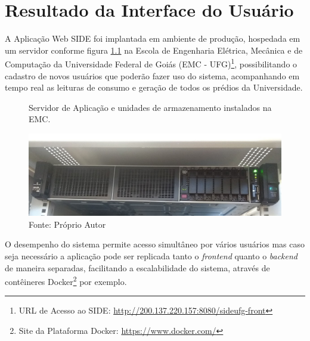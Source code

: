 \chapter {Resultado da Interface do Usuário}
\label{c:resultado_da_interface_do_usuario}

A Aplicação Web SIDE foi implantada em ambiente de produção, hospedada em um servidor conforme figura \ref{fig:servidor} na Escola de Engenharia Elétrica, Mecânica e de Computação da Universidade Federal de Goiás (EMC - UFG)\footnote{URL de Acesso ao SIDE: \url{http://200.137.220.157:8080/sideufg-front}}, possibilitando o cadastro de novos usuários que poderão fazer uso do sistema, acompanhando em tempo real as leituras de consumo e geração de todos os prédios da Universidade.

\begin{figure}[H]
    \centering
    \caption{ Servidor de Aplicação e unidades de armazenamento instalados na EMC.}
\includegraphics[width=\linewidth]{imagens/servidor.jpg}
    \caption*{Fonte: Próprio Autor}
    \label{fig:servidor}
\end{figure}

O desempenho do sistema permite acesso simultâneo por vários usuários mas caso seja necessário a aplicação pode ser replicada tanto o \textit{frontend} quanto o \textit{backend} de maneira separadas, facilitando a escalabilidade do sistema, através de contêineres Docker\footnote{Site da Plataforma Docker: \url{https://www.docker.com/}} por exemplo.